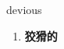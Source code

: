 
\begin{frame}
{\huge devious}
\begin{center}
\begin{enumerate}\Large
  \item \textbf{狡猾的}
\end{enumerate}
\end{center}
\end{frame}
